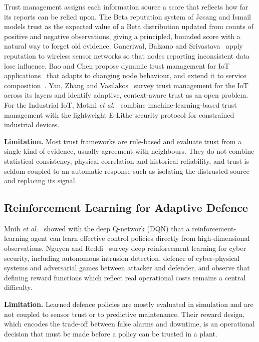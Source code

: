 Trust management assigns each information source a score that reflects how far its reports can be relied upon. The Beta reputation system of J{\o}sang and Ismail~\cite{josang2002beta} models trust as the expected value of a Beta distribution updated from counts of positive and negative observations, giving a principled, bounded score with a natural way to forget old evidence. Ganeriwal, Balzano and Srivastava~\cite{ganeriwal2008reputation} apply reputation to wireless sensor networks so that nodes reporting inconsistent data lose influence. Bao and Chen propose dynamic trust management for IoT applications~\cite{bao2012dynamic} that adapts to changing node behaviour, and extend it to service composition~\cite{bao2012trust}. Yan, Zhang and Vasilakos~\cite{yan2014trust} survey trust management for the IoT across its layers and identify adaptive, context-aware trust as an open problem. For the Industrial IoT, Motmi \emph{et al.}~\cite{motmi2022elithe} combine machine-learning-based trust management with the lightweight E-Lithe security protocol for constrained industrial devices.

\textbf{Limitation.} Most trust frameworks are rule-based and evaluate trust from a single kind of evidence, usually agreement with neighbours. They do not combine statistical consistency, physical correlation and historical reliability, and trust is seldom coupled to an automatic response such as isolating the distrusted source and replacing its signal.

\subsection{Reinforcement Learning for Adaptive Defence}

Mnih \emph{et al.}~\cite{mnih2015dqn} showed with the deep Q-network (DQN) that a reinforcement-learning agent can learn effective control policies directly from high-dimensional observations. Nguyen and Reddi~\cite{nguyen2023drl} survey deep reinforcement learning for cyber security, including autonomous intrusion detection, defence of cyber-physical systems and adversarial games between attacker and defender, and observe that defining reward functions which reflect real operational costs remains a central difficulty.

\textbf{Limitation.} Learned defence policies are mostly evaluated in simulation and are not coupled to sensor trust or to predictive maintenance. Their reward design, which encodes the trade-off between false alarms and downtime, is an operational decision that must be made before a policy can be trusted in a plant.


